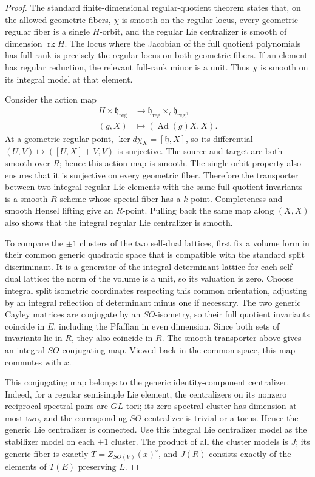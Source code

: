 \documentclass[11pt,a4paper]{article}
\theoremstyle{definition}
\theoremstyle{remark}
\begin{document}
\begin{proof}
The standard finite-dimensional regular-quotient theorem states that,
on the allowed geometric fibers, \(\chi\) is smooth on the regular
locus, every geometric regular fiber is a single \(H\)-orbit, and the
regular Lie centralizer is smooth of dimension \(\operatorname{rk}H\).
The locus where the Jacobian of the full quotient polynomials has
full rank is precisely the regular locus on both geometric fibers.
If an element has regular reduction, the relevant full-rank minor
is a unit. Thus \(\chi\) is smooth on its integral model at that
element.

Consider the action map
\[
\begin{aligned}
 H\times\mathfrak h_{\mathrm{reg}}
 &\longrightarrow
 \mathfrak h_{\mathrm{reg}}
       \times_{\mathfrak c}\mathfrak h_{\mathrm{reg}},\\
 (g,X)&\longmapsto(\operatorname{Ad}(g)X,X).
\end{aligned}
\]
At a geometric regular point,
\(\ker d\chi_X=[\mathfrak h,X]\), so its differential
\((U,V)\mapsto([U,X]+V,V)\) is surjective. The source and target are
both smooth over \(R\); hence this action map is smooth. The
single-orbit property also ensures that it is surjective on every
geometric fiber. Therefore the transporter between two integral
regular Lie elements with the same full quotient invariants is a
smooth \(R\)-scheme whose special fiber has a \(k\)-point.
Completeness and smooth Hensel lifting give an \(R\)-point.
Pulling back the same map along \((X,X)\) also shows that the
integral regular Lie centralizer is smooth.

To compare the \(\pm1\) clusters of the two self-dual lattices, first
fix a volume form in their common generic quadratic space that is
compatible with the standard split discriminant. It is a generator
of the integral determinant lattice for each self-dual lattice:
the norm of the volume is a unit, so its valuation is zero. Choose
integral split isometric coordinates respecting this common
orientation, adjusting by an integral reflection of determinant
minus one if necessary. The two generic Cayley matrices are
conjugate by an \(SO\)-isometry, so their full quotient invariants
coincide in \(E\), including the Pfaffian in even dimension. Since
both sets of invariants lie in \(R\), they also coincide in \(R\).
The smooth transporter above gives an integral \(SO\)-conjugating
map. Viewed back in the common space, this map commutes with \(x\).

This conjugating map belongs to the generic identity-component
centralizer. Indeed, for a regular semisimple Lie element, the
centralizers on its nonzero reciprocal spectral pairs are \(GL\)
tori; its zero spectral cluster has dimension at most two, and the
corresponding \(SO\)-centralizer is trivial or a torus. Hence the
generic Lie centralizer is connected. Use this integral Lie
centralizer model as the stabilizer model on each \(\pm1\) cluster.
The product of all the cluster models is \(J\); its generic fiber
is exactly \(T=Z_{SO(V)}(x)^\circ\), and \(J(R)\) consists exactly
of the elements of \(T(E)\) preserving \(L\).


\end{proof}
\end{document}

